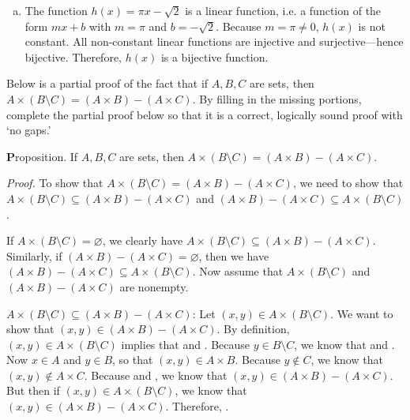 \documentclass[12pt,letterpaper]{exam}
\newcommand{\blank}[1]{\underline{\hspace{#1}}} %
\begin{document}
\begin{questions}
\begin{enumerate}[(a)]
\item The function $h(x)= \pi x - \sqrt{2}$ is a linear function, i.e. a function of the form $mx + b$ with $m= \pi$ and $b= -\sqrt{2}$. Because $m= \pi \neq 0$, $h(x)$ is not constant. All non-constant linear functions are injective and surjective---hence bijective. Therefore, $h(x)$ is a bijective function. 
\end{enumerate}



\newpage
\question[10] Below is a partial proof of the fact that if $A, B, C$ are sets, then $A \times (B \setminus C)= (A \times B) - (A \times C)$. By filling in the missing portions, complete the partial proof below so that it is a correct, logically sound proof with `no gaps.' \pspace

{\textbf Proposition.} If $A, B, C$ are sets, then $A \times (B \setminus C)= (A \times B) - (A \times C)$. \pspace

{\itshape Proof.} To show that $A \times (B \setminus C)= (A \times B) - (A \times C)$, we need to show that $A \times (B \setminus C) \subseteq (A \times B) - (A \times C)$ and $(A \times B) - (A \times C) \subseteq A \times (B \setminus C)$. \par\vspace{2\baselineskip}

If $A \times (B \setminus C)= \varnothing$, we clearly have $A \times (B \setminus C) \subseteq (A \times B) - (A \times C)$. Similarly, if $(A \times B) - (A \times C)= \varnothing$, then we have $(A \times B) - (A \times C) \subseteq A \times (B \setminus C)$. Now assume that $A \times (B \setminus C)$ and $(A \times B) - (A \times C)$ are nonempty. \par\vspace{2\baselineskip}

$A \times (B \setminus C) \subseteq (A \times B) - (A \times C)$: Let $(x, y) \in A \times (B \setminus C)$. We want to show that \pspace $(x, y) \in (A \times B) - (A \times C)$. By definition, $(x, y) \in A \times (B \setminus C)$ implies that \blank{3cm} \pspace and \blank{3cm}. Because $y \in B \setminus C$, we know that \blank{4cm} and \pspace \blank{4cm}. Now $x \in A$ and $y \in B$, so that $(x, y) \in A \times B$. Because $y \notin C$, \pspace we know that $(x, y) \notin A \times C$. Because \blank{4cm} and \blank{4cm}, \pspace we know that $(x, y) \in (A \times B) - (A \times C)$. But then if $(x, y) \in A \times (B \setminus C)$, we know \pspace that $(x, y) \in (A \times B) - (A \times C)$. Therefore, \blank{6cm}. \par\vspace{2\baselineskip}


\end{questions}
\end{document}
